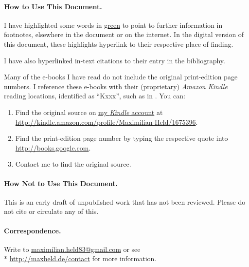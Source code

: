 \paragraph{How to Use This Document.}
I have highlighted some words in \href{chap:how2}{green} to point to further information in footnotes, elsewhere in the document or on the internet.
In the digital version of this document, these highlights hyperlink to their respective place of finding.

I have also hyperlinked in-text citations to their entry in the bibliography.

Many of the e-books I have read do not include the original print-edition page numbers.
I reference these e-books with their (proprietary) \emph{Amazon Kindle \circledR} reading locations, identified as ``Kxxx'', such as in \citet[K50]{McCaffery2002}.
You can:
\begin{enumerate}
	\item
		Find the original source on \href{http://kindle.amazon.com/profile/Maximilian-Held/1675396}{my \emph{Kindle \circledR} account} at\\ \url{http://kindle.amazon.com/profile/Maximilian-Held/1675396}.
	\item
		Find the print-edition page number by typing the respective quote into \url{http://books.google.com}.
	\item
		Contact me to find the original source.
\end{enumerate}

\paragraph{How Not to Use This Document.}
This is an early draft of unpublished work that has not been reviewed. Please do not cite or circulate any of this.

\paragraph{Correspondence.}
Write to \href{mailto:maximilian.held83@gmail.com}{maximilian.held83@gmail.com} or see \\* \url{http://maxheld.de/contact} for more information.
